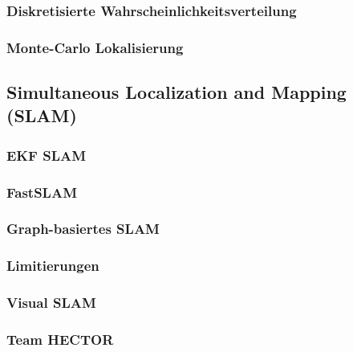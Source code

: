 \documentclass[a4paper, 11pt, accentcolor = tud3b]{tudreport}
\begin{document}
				\subsubsection{Diskretisierte Wahrscheinlichkeitsverteilung} %

				\subsubsection{Monte-Carlo Lokalisierung} %

			\subsection{Simultaneous Localization and Mapping (SLAM)} %

				\subsubsection{EKF SLAM} %

				\subsubsection{FastSLAM} %

				\subsubsection{Graph-basiertes SLAM} %

				\subsubsection{Limitierungen} %

				\subsubsection{Visual SLAM} %

				\subsubsection{Team HECTOR} %
\end{document}
